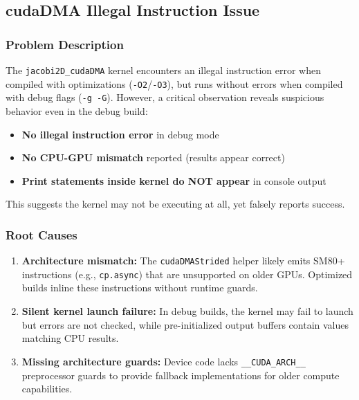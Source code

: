 
\subsection{cudaDMA Illegal Instruction Issue}

\subsubsection{Problem Description}

The \texttt{jacobi2D\_cudaDMA} kernel encounters an illegal instruction error when compiled with optimizations (\texttt{-O2}/\texttt{-O3}), but runs without errors when compiled with debug flags (\texttt{-g -G}). However, a critical observation reveals suspicious behavior even in the debug build:

\begin{itemize}
    \item \textbf{No illegal instruction error} in debug mode
    \item \textbf{No CPU-GPU mismatch} reported (results appear correct)
    \item \textbf{Print statements inside kernel do NOT appear} in console output
\end{itemize}

This suggests the kernel may not be executing at all, yet falsely reports success.

\subsubsection{Root Causes}

\begin{enumerate}
    \item \textbf{Architecture mismatch:} The \texttt{cudaDMAStrided} helper likely emits SM80+ instructions (e.g., \texttt{cp.async}) that are unsupported on older GPUs. Optimized builds inline these instructions without runtime guards.
    
    \item \textbf{Silent kernel launch failure:} In debug builds, the kernel may fail to launch but errors are not checked, while pre-initialized output buffers contain values matching CPU results.
    
    \item \textbf{Missing architecture guards:} Device code lacks \texttt{\_\_CUDA\_ARCH\_\_} preprocessor guards to provide fallback implementations for older compute capabilities.
\end{enumerate}

